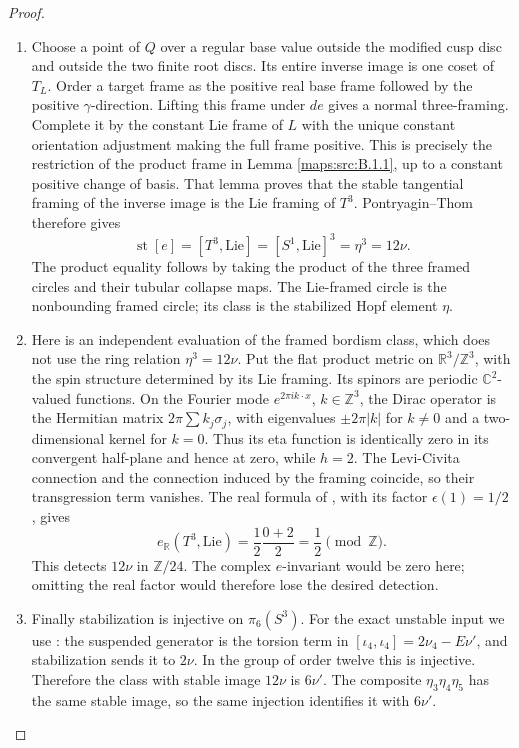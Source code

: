 \begin{proof}
\begin{enumerate}[label=\arabic*.,leftmargin=*]
\item Choose a point of $Q$ over a regular base value outside
the modified cusp disc and outside the two finite root
discs.  Its entire inverse image is one coset of $T_L$.
Order a target frame as the positive real base frame followed
by the positive $\gamma$-direction.  Lifting this frame
under $de$ gives a normal three-framing.  Complete it by
the constant Lie frame of $L$ with the unique constant
orientation adjustment making the full frame positive.
This is precisely the restriction of the product frame
in Lemma \ref{maps:src:B.1.1}, up to a constant positive change of basis.
That lemma proves that the stable tangential framing of
the inverse image is the Lie framing of $T^3$.
Pontryagin--Thom therefore gives
\[
 \operatorname{st}[e]=[T^3,\mathrm{Lie}]
 = [S^1,\mathrm{Lie}]^3=\eta^3=12\nu.
 \tag{B.1.2}\label{maps:eq:B.1.2}
\]
The product equality follows by taking the product of the
three framed circles and their tubular collapse maps.
The Lie-framed circle is the nonbounding framed circle;
its class is the stabilized Hopf element $\eta$.

\item Here is an independent evaluation of the framed bordism
class, which does not use the ring relation $\eta^3=12\nu$.
Put the flat product metric on $\mathbb R^3/\mathbb Z^3$,
with the spin structure determined by its Lie framing.
Its spinors are periodic $\mathbb C^2$-valued functions.
On the Fourier mode $e^{2\pi i k\cdot x}$, $k\in\mathbb Z^3$,
the Dirac operator is the Hermitian matrix
$2\pi\sum k_j\sigma_j$, with eigenvalues
$\pm2\pi|k|$ for $k\ne0$ and a two-dimensional kernel
for $k=0$.  Thus its eta function is identically zero in
its convergent half-plane and hence at zero, while $h=2$.
The Levi-Civita connection and the connection induced
by the framing coincide, so their transgression term
vanishes.  The real formula of
\cite[Theorem (4.14), p.~423]{mapsAPS2}, with its factor
$\epsilon(1)=1/2$, gives
\[
 e_{\mathbb R}(T^3,\mathrm{Lie})
       =\frac12\frac{0+2}{2}=\frac12\pmod{\mathbb Z}.
 \tag{B.1.3}\label{maps:eq:B.1.3}
\]
This detects $12\nu$ in $\mathbb Z/24$.  The complex
$e$-invariant would be zero here; omitting the real
factor would therefore lose the desired detection.

\item Finally stabilization is injective on $\pi_6(S^3)$.
For the exact unstable input we use
\cite[Theorem 4.1 and Corollaries 4.2--4.3]{mapsToda52}:
the suspended generator is the torsion term in
$[\iota_4,\iota_4]=2\nu_4-E\nu'$, and stabilization
sends it to $2\nu$.  In the group of order twelve this
is injective.  Therefore the class with stable image
$12\nu$ is $6\nu'$.  The composite
$\eta_3\eta_4\eta_5$ has the same stable image, so the
same injection identifies it with $6\nu'$.
\end{enumerate}
\end{proof}

